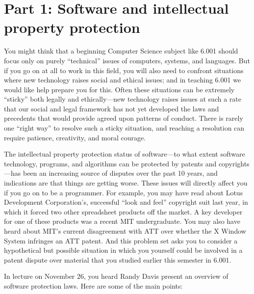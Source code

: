 \section{Part 1:  Software and intellectual property protection}

You might think that a beginning Computer Science subject like 6.001
should focus only on purely ``technical'' issues of computers,
systems, and languages.  But if you go on at all to work in this
field, you will also need to confront situations where new technology
raises social and ethical issues; and in teaching 6.001 we would like
help prepare you for this.  Often these situations can be extremely
``sticky'' both legally and ethically---new technology raises issues
at such a rate that our social and legal framework has not yet
developed the laws and precedents that would provide agreed upon
patterns of conduct.  There is rarely one ``right way'' to resolve
such a sticky situation, and reaching a resolution can require
patience, creativity, and moral courage.

The intellectual property protection status of software---to what
extent software technology, programs, and algorithms can be protected
by patents and copyrights---has been an increasing source of disputes
over the past 10 years, and indications are that things are getting
worse.  These issues will directly affect you if you go on to be a
programmer.  For example, you may have read about Lotus Development
Corporation's, successful ``look and feel'' copyright suit last year,
in which it forced two other spreadsheet products off the market.  A
key developer for one of these products was a recent MIT
undergraduate.  You may also have heard about MIT's current
disagreement with ATT over whether the X Window System infringes an
ATT patent.  And this problem set asks you to consider a hypothetical
but possible situation in which you yourself could be involved in a
patent dispute over material that you studied earlier this semester in
6.001.

In lecture on November 26, you heard Randy Davis present an overview
of software protection laws.  Here are some of the main points:

